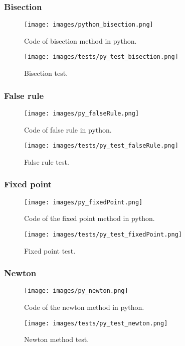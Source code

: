 \documentclass{article}
\begin{document}
\subsubsection{Bisection}
\begin{figure}[ht]
\centering
\texttt{[image: images/python\_bisection.png]}
\caption{\label{fig:py_bisc}Code of bisection method in python.}
\end{figure}
\FloatBarrier
\begin{figure}[ht]
\centering
\texttt{[image: images/tests/py\_test\_bisection.png]}
\caption{\label{fig:py_test_bisc}Bisection test.}
\end{figure}
\FloatBarrier

\subsubsection{False rule}
\begin{figure}[ht]
\centering
\texttt{[image: images/py\_falseRule.png]}
\caption{\label{fig:py_falseRule}Code of false rule in python.}
\end{figure}
\FloatBarrier
\begin{figure}[ht]
\centering
\texttt{[image: images/tests/py\_test\_falseRule.png]}
\caption{\label{fig:py_falseRule}False rule test.}
\end{figure}
\FloatBarrier

\subsubsection{Fixed point}
\begin{figure}[ht]
\centering
\texttt{[image: images/py\_fixedPoint.png]}
\caption{\label{fig:py_fixedPoint}Code of the fixed point method in python.}
\end{figure}
\FloatBarrier
\begin{figure}[ht]
\centering
\texttt{[image: images/tests/py\_test\_fixedPoint.png]}
\caption{\label{fig:py_fixedPoint}Fixed point test.}
\end{figure}
\FloatBarrier

\subsubsection{Newton}
\begin{figure}[ht]
\centering
\texttt{[image: images/py\_newton.png]}
\caption{\label{fig:py_newton}Code of the newton method in python.}
\end{figure}
\FloatBarrier
\begin{figure}[ht]
\centering
\texttt{[image: images/tests/py\_test\_newton.png]}
\caption{\label{fig:py_newton}Newton method test.}
\end{figure}
\FloatBarrier
\end{document}
